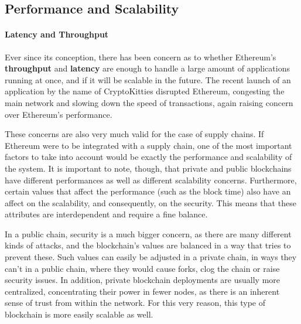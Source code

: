 
\subsection{Performance and Scalability}

\paragraph{Latency and Throughput} 

Ever since its conception, there has been concern as to whether Ethereum's \textbf{throughput} and \textbf{latency} are enough to handle a large amount of applications running at once, and if it will be scalable in the future. The recent launch of an application by the name of CryptoKitties disrupted Ethereum, congesting the main network and slowing down the speed of transactions, again raising concern over Ethereum's performance.

These concerns are also very much valid for the case of supply chains. If Ethereum were to be integrated with a supply chain, one of the most important factors to take into account would be exactly the performance and scalability of the system. It is important to note, though, that private and public blockchains have different performances as well as different scalability concerns. Furthermore, certain values that affect the performance (such as the block time) also have an affect on the scalability, and consequently, on the security. This means that these attributes are interdependent and require a fine balance. 

In a public chain, security is a much bigger concern, as there are many different kinds of attacks, and the blockchain's values are balanced in a way that tries to prevent these. Such values can easily be adjusted in a private chain, in ways they can't in a public chain, where they would cause forks, clog the chain or raise security issues. In addition, private blockchain deployments are usually more centralized, concentrating their power in fewer nodes, as there is an inherent sense of trust from within the network. For this very reason, this type of blockchain is more easily scalable as well.

